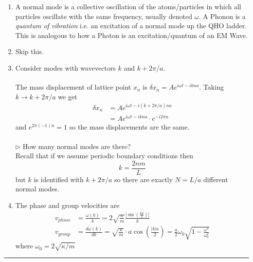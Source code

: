 \documentclass[11pt]{article}
\begin{document}
\begin{enumerate}[label=(\alph*)]
  \item A normal mode is a collective oscillation of the atoms/particles in which all particles oscillate with the same frequency, usually denoted $\omega$. A Phonon is a \textit{quantum of vibration} i.e. an excitation of a normal mode up the QHO ladder. This is analogous to how a Photon is an excitation/quantum of an EM Wave.
  

  \item Skip this.
  

  \item Consider modes with wavevectors $k$ and $k + 2\pi/a$.
  \\
  \\
  The mass displacement of lattice point $x_n$ is $\delta x_n = Ae^{i\omega t  - ikna}$. Taking $k \rightarrow k + 2\pi/a$ we get 
  \begin{align*}
    \delta x_n &= Ae^{i\omega t - i(k + 2\pi/a)na} \\
    &= Ae^{i\omega t - ikna } \cdot e^{-i2\pi n} 
  \end{align*}
  and $e^{2\pi(-1)n} = 1$ so the mass displacements are the same.
  \\
  \\
  $\triangleright$ How many normal modes are there? \\
  Recall that if we assume periodic boundary conditions then $$ k = \frac{2nm}{L} $$ but $k$ is identified with $k + 2\pi/a$ so there are exactly $N = L/a$ different normal modes.

  \item The phase and group velocities are 
  \begin{align*}
  v_{phase} &= \frac{\omega(k)}{k} = 2 \sqrt{\frac{\kappa}{m}} \frac{\left| \sin\left(\frac{ka}{2}\right) \right|}{k} \\
  v_{group} &= \frac{d\omega(k)}{dk} = \sqrt{\frac{\kappa}{m}} \cdot a \cos\left(\frac{|k|a}{2}\right) = \frac{a}{2} \omega_0 \sqrt{1 - \frac{\omega^2}{\omega_0^2}} 
  \end{align*} where $\omega_0 = 2 \sqrt{\kappa/m}$
\end{enumerate}

\vskip 0.5cm
\hrule
\pagebreak












% 
\end{document}
